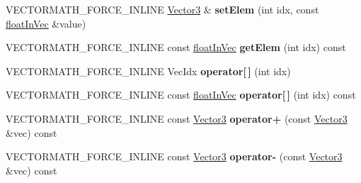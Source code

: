 \begin{DoxyCompactItemize}
\item 
\mbox{\label{classVectormath_1_1Aos_1_1Vector3_a7775577ca9627fbc38a5e824bf601afe}} 
V\+E\+C\+T\+O\+R\+M\+A\+T\+H\+\_\+\+F\+O\+R\+C\+E\+\_\+\+I\+N\+L\+I\+NE \hyperlink{classVectormath_1_1Aos_1_1Vector3}{Vector3} \& {\bfseries set\+Elem} (int idx, const \hyperlink{classVectormath_1_1floatInVec}{float\+In\+Vec} \&value)
\item 
\mbox{\label{classVectormath_1_1Aos_1_1Vector3_a0a307516df3385074aa2e3477c5e8517}} 
V\+E\+C\+T\+O\+R\+M\+A\+T\+H\+\_\+\+F\+O\+R\+C\+E\+\_\+\+I\+N\+L\+I\+NE const \hyperlink{classVectormath_1_1floatInVec}{float\+In\+Vec} {\bfseries get\+Elem} (int idx) const
\item 
\mbox{\label{classVectormath_1_1Aos_1_1Vector3_ac7873beab7df5fc972c52b45f78cebaa}} 
V\+E\+C\+T\+O\+R\+M\+A\+T\+H\+\_\+\+F\+O\+R\+C\+E\+\_\+\+I\+N\+L\+I\+NE Vec\+Idx {\bfseries operator\mbox{[}$\,$\mbox{]}} (int idx)
\item 
\mbox{\label{classVectormath_1_1Aos_1_1Vector3_ac2e26c51238f72bf70fe16507d505f33}} 
V\+E\+C\+T\+O\+R\+M\+A\+T\+H\+\_\+\+F\+O\+R\+C\+E\+\_\+\+I\+N\+L\+I\+NE const \hyperlink{classVectormath_1_1floatInVec}{float\+In\+Vec} {\bfseries operator\mbox{[}$\,$\mbox{]}} (int idx) const
\item 
\mbox{\label{classVectormath_1_1Aos_1_1Vector3_a44ed2c65d0cc969f1e1d3ae23a07303c}} 
V\+E\+C\+T\+O\+R\+M\+A\+T\+H\+\_\+\+F\+O\+R\+C\+E\+\_\+\+I\+N\+L\+I\+NE const \hyperlink{classVectormath_1_1Aos_1_1Vector3}{Vector3} {\bfseries operator+} (const \hyperlink{classVectormath_1_1Aos_1_1Vector3}{Vector3} \&vec) const
\item 
\mbox{\label{classVectormath_1_1Aos_1_1Vector3_a083ddccb7716ee66061b8f3dcd3afb4e}} 
V\+E\+C\+T\+O\+R\+M\+A\+T\+H\+\_\+\+F\+O\+R\+C\+E\+\_\+\+I\+N\+L\+I\+NE const \hyperlink{classVectormath_1_1Aos_1_1Vector3}{Vector3} {\bfseries operator-\/} (const \hyperlink{classVectormath_1_1Aos_1_1Vector3}{Vector3} \&vec) const
\item 
\mbox{\label{classVectormath_1_1Aos_1_1Vector3_a2412659ac4334e734c0b0ae88ee2e75d}} 

\end{DoxyCompactItemize}
